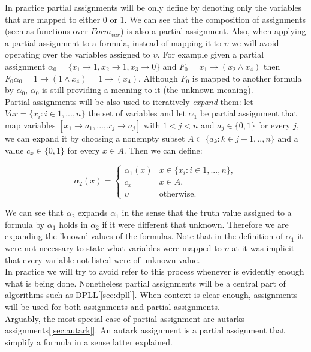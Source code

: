 In practice partial assignments will be only define by denoting only the variables that are mapped to either 0 or 1. We can see that the composition of assignments (seen as functions over $Form_{var}$) is also a partial assignment. Also, when applying a partial assignment to a formula, instead of mapping it to $\upsilon$ we will avoid operating over the variables assigned to $\upsilon$. For example given a partial assignment $\alpha_0 = \{x_1 \to 1, x_2\to 1, x_3 \to 0\}$ and $F_0=x_1\to (x_2\wedge x_4)$ then  $F_0\alpha_0=1 \to (1\wedge x_4)= 1 \to (x_4)$. Although $F_0$ is mapped to another formula by $\alpha_0$, $\alpha_0$ is still providing a meaning to it (the unknown meaning). \\



Partial assignments will be also used to iteratively \emph{expand} them: let $Var= \{x_i:i\in 1,...,n\}$ the set of variables and let $\alpha_1$ be partial assignment that map variables $[x_1\to a_1,...,x_j\to a_j]$ with $1<j<n$ and $a_j\in\{0,1\}$ for every $j$, we can expand it by choosing a nonempty subset  $A\subset\{a_k: k\in j+1,..,n\}$ and a value $c_x \in \{0,1\}$ for every $x\in A$. Then we can define:

$$
\alpha_2(x)=
\begin{cases}
  \alpha_1(x) & x \in \{x_i : i \in 1,...,n\},\\
  c_x & x\in A, \\
  \upsilon & \text{otherwise}.
\end{cases}
$$

We can see that $\alpha_2$ expands $\alpha_1$ in the sense that the truth value assigned to a formula by $\alpha_1$ holds in $\alpha_2$ if it were different that unknown. Therefore we are expanding the 'known' values of the formulas. Note that in the definition of $\alpha_1$ it were not necessary to state what variables were mapped to $\upsilon$ at it was implicit that every variable not listed were of unknown  value.\\

In practice we will try to avoid refer to this process whenever is evidently enough what is being done. Nonetheless partial assignments will be a central part of algorithms such as DPLL[\ref{sec:dpll}]. When context is clear enough, assignments will be used for both assignments and partial assignments.\\

Arguably, the most special case of partial assignment are autarks assignments[\ref{sec:autark}]. An autark assignment is a partial assignment that simplify a formula in a sense latter explained.\\

